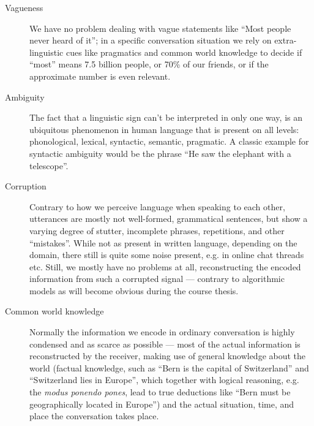\begin{description}
  \item[Vagueness] We have no problem dealing with vague statements like ``Most people never heard of it''; in a specific conversation situation we rely on extra-linguistic cues like pragmatics and common world knowledge to decide if ``most'' means 7.5 billion people, or 70\% of our friends, or if the approximate number is even relevant.
  \item[Ambiguity] The fact that a linguistic sign can't be interpreted in only one way, is an ubiquitous phenomenon in human language that is present on all levels: phonological, lexical, syntactic, semantic, pragmatic. A classic example for syntactic ambiguity would be the phrase ``He saw the elephant with a telescope''.
  \item[Corruption] Contrary to how we perceive language when speaking to each other, utterances are mostly not well-formed, grammatical sentences, but show a varying degree of stutter, incomplete phrases, repetitions, and other ``mistakes''. While not as present in written language, depending on the domain, there still is quite some noise present, e.g. in online chat threads etc. Still, we mostly have no problems at all, reconstructing the encoded information from such a corrupted signal --- contrary to algorithmic models as will become obvious during the course thesis.
  \item[Common world knowledge] Normally the information we encode in ordinary conversation is highly condensed and as scarce as possible --- most of the actual information is reconstructed by the receiver, making use of general knowledge about the world (factual knowledge, such as ``Bern is the capital of Switzerland'' and ``Switzerland lies in Europe'', which together with logical reasoning, e.g. the \textit{modus ponendo pones}, lead to true deductions like ``Bern must be geographically located in Europe'') and the actual situation, time, and place the conversation takes place.
\end{description}


